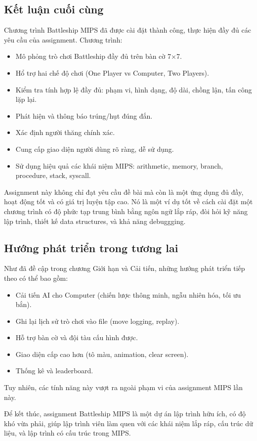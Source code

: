 \subsection{Kết luận cuối cùng}

Chương trình Battleship MIPS đã được cài đặt thành công, thực hiện đầy đủ các yêu cầu của assignment. Chương trình:

\begin{itemize}
    \item [OK] Mô phỏng trò chơi Battleship đầy đủ trên bàn cờ 7$\times$7.
    \item [OK] Hổ trợ hai chế độ chơi (One Player vs Computer, Two Players).
    \item [OK] Kiểm tra tính hợp lệ đầy đủ: phạm vi, hình dạng, độ dài, chồng lận, tấn công lặp lại.
    \item [OK] Phát hiện và thông báo trúng/hụt đúng đắn.
    \item [OK] Xác định người thăng chính xác.
    \item [OK] Cung cấp giao diện người dùng rõ ràng, dễ sử dụng.
    \item [OK] Sử dụng hiệu quả các khái niệm MIPS: arithmetic, memory, branch, procedure, stack, syscall.
\end{itemize}

Assignment này không chỉ đạt yêu cầu đề bài mà còn là một ứng dụng đủ đầy, hoạt động tốt và có giá trị luyện tập cao. Nó là một ví dụ tốt về cách cài đặt một chương trình có độ phức tạp trung bình bằng ngôn ngữ lắp ráp, đòi hỏi kỹ năng lập trình, thiết kế data structures, và khả năng debuggging.

\subsection{Hướng phát triển trong tương lai}

Như đã đề cập trong chương Giới hạn và Cải tiến, những hướng phát triển tiếp theo có thể bao gồm:

\begin{itemize}
    \item Cải tiến AI cho Computer (chiến lược thông minh, ngẫu nhiên hóa, tối ưu bắn).
    \item Ghi lại lịch sử trò chơi vào file (move logging, replay).
    \item Hỗ trợ bàn cờ và đội tàu cấu hình được.
    \item Giao diện cấp cao hơn (tô màu, animation, clear screen).
    \item Thống kê và leaderboard.
\end{itemize}

Tuy nhiên, các tính năng này vượt ra ngoài phạm vi của assignment MIPS lần này.

Để kết thúc, assignment Battleship MIPS là một dự án lập trình hữu ích, có độ khó vừa phải, giúp lập trình viên làm quen với các khái niệm lắp ráp, cấu trúc dữ liệu, và lập trình có cấu trúc trong MIPS.
